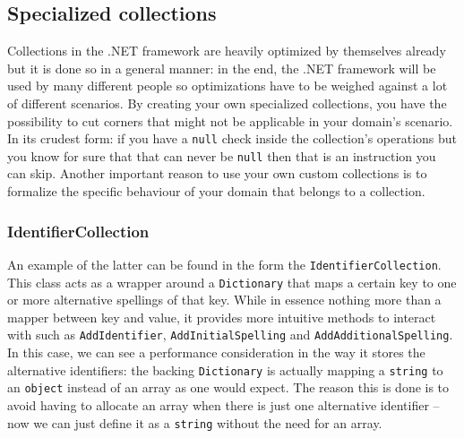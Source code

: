 \newpage
\subsection{Specialized collections}
\label{sec:specialized-collections}

Collections in the .NET framework are heavily optimized by themselves already but it is done so in a general manner: in the end, the .NET framework will be used by many different people so optimizations have to be weighed against a lot of different scenarios. By creating your own specialized collections, you have the possibility to cut corners that might not be applicable in your domain's scenario. In its crudest form: if you have a \texttt{null} check inside the collection's operations but you know for sure that that can never be \texttt{null} then that is an instruction you can skip. Another important reason to use your own custom collections is to formalize the specific behaviour of your domain that belongs to a collection. 

\subsubsection{IdentifierCollection}
\label{sec:spec-coll-identifiercollection}

An example of the latter can be found in the form the \texttt{IdentifierCollection}. This class acts as a wrapper around a \texttt{Dictionary} that maps a certain key to one or more alternative spellings of that key. While in essence nothing more than a mapper between key and value, it provides more intuitive methods to interact with such as \texttt{AddIdentifier}, \texttt{AddInitialSpelling} and \texttt{AddAdditionalSpelling}.
In this case, we can see a performance consideration in the way it stores the alternative identifiers: the backing \texttt{Dictionary} is actually mapping a \texttt{string} to an \texttt{object} instead of an array as one would expect. The reason this is done is to avoid having to allocate an array when there is just one alternative identifier -- now we can just define it as a \texttt{string} without the need for an array.

\clearpage

